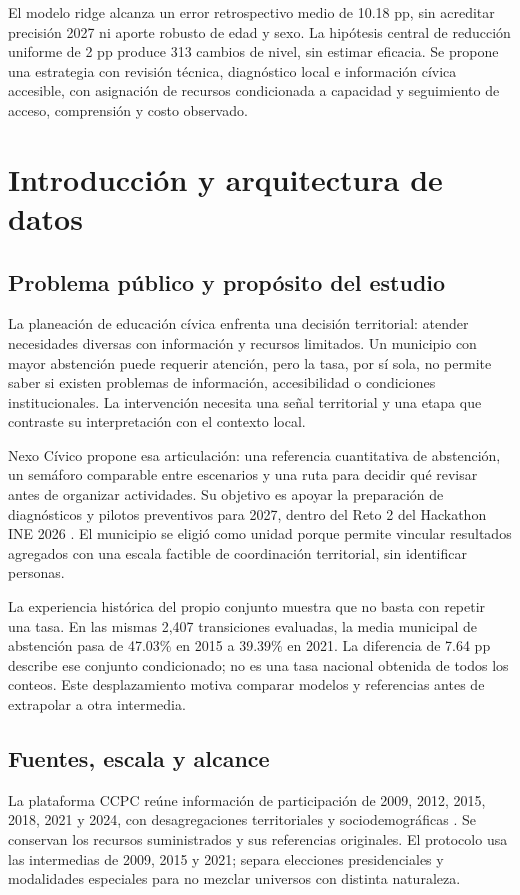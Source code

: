 \documentclass[12pt,a4paper]{article}
\newcommand{\primerparrafo}{\par\noindent\hspace*{1.1em}}
\newcommand{\pagina}[1]{\clearpage\section{#1}}
\begin{document}
El modelo ridge alcanza un error retrospectivo medio de 10.18 pp, sin acreditar precisión 2027 ni aporte robusto de edad y sexo. La hipótesis central de reducción uniforme de 2 pp produce 313 cambios de nivel, sin estimar eficacia. Se propone una estrategia con revisión técnica, diagnóstico local e información cívica accesible, con asignación de recursos condicionada a capacidad y seguimiento de acceso, comprensión y costo observado.

\vspace{0.15cm}
\begingroup
\singlespacing
\tableofcontents
\endgroup

\pagina{Introducción y arquitectura de datos}
\subsection{Problema público y propósito del estudio}
\primerparrafo
La planeación de educación cívica enfrenta una decisión territorial: atender necesidades diversas con información y recursos limitados. Un municipio con mayor abstención puede requerir atención, pero la tasa, por sí sola, no permite saber si existen problemas de información, accesibilidad o condiciones institucionales. La intervención necesita una señal territorial y una etapa que contraste su interpretación con el contexto local.

Nexo Cívico propone esa articulación: una referencia cuantitativa de abstención, un semáforo comparable entre escenarios y una ruta para decidir qué revisar antes de organizar actividades. Su objetivo es apoyar la preparación de diagnósticos y pilotos preventivos para 2027, dentro del Reto 2 del Hackathon INE 2026 \citep{convocatoria}. El municipio se eligió como unidad porque permite vincular resultados agregados con una escala factible de coordinación territorial, sin identificar personas.

La experiencia histórica del propio conjunto muestra que no basta con repetir una tasa. En las mismas 2,407 transiciones evaluadas, la media municipal de abstención pasa de 47.03\% en 2015 a 39.39\% en 2021. La diferencia de 7.64 pp describe ese conjunto condicionado; no es una tasa nacional obtenida de todos los conteos. Este desplazamiento motiva comparar modelos y referencias antes de extrapolar a otra intermedia.

\subsection{Fuentes, escala y alcance}
\primerparrafo
La plataforma CCPC reúne información de participación de 2009, 2012, 2015, 2018, 2021 y 2024, con desagregaciones territoriales y sociodemográficas \citep{fuentes,manual_ccpc}. Se conservan los recursos suministrados y sus referencias originales. El protocolo usa las intermedias de 2009, 2015 y 2021; separa elecciones presidenciales y modalidades especiales para no mezclar universos con distinta naturaleza.
\end{document}
